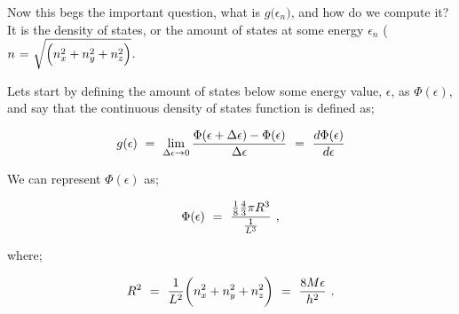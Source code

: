 \documentclass{article}
\begin{document}
Now this begs the important question, what is \begin{math} g \big( \epsilon_{n} \big) \end{math}, and how do we compute it? It is the density of states, or the amount of states at some energy \begin{math} \epsilon_{n} \end{math} ( \begin{math} n \hspace{0.025cm} = \hspace{0.025cm} \sqrt{ \Big( n_x^2 + n_y^2 + n_z^2 \Big)} \end{math}.

Lets start by defining the amount of states below some energy value, \begin{math} \epsilon \end{math}, as \begin{math} \Phi ( \epsilon ) \end{math}, and say that the continuous density of states function is defined as;

\begin{equation} \label{eb-eq-256-79}
g ( \epsilon ) \hspace{0.125cm} = \hspace{0.125cm} \lim_{\Delta \epsilon \rightarrow 0} \frac{ \Phi ( \epsilon + \Delta \epsilon ) - \Phi ( \epsilon )}{\Delta \epsilon} \hspace{0.125cm} = \hspace{0.125cm} \frac{d  \Phi ( \epsilon )}{d \epsilon}
\end{equation}

We can represent \begin{math} \Phi ( \epsilon ) \end{math} as;

\begin{equation} \label{eb-eq-256-80}
\Phi ( \epsilon ) \hspace{0.125cm} = \hspace{0.125cm} \frac{ \frac{1}{8} \frac{4}{3} \pi R^3}{\frac{1}{L^3}} \hspace{0.125cm} , 
\end{equation}

where;

\begin{equation} \label{eb-eq-256-81}
R^2 \hspace{0.125cm} = \hspace{0.125cm} \frac{1}{L^2} \bigg( n_x^2 + n_y^2 + n_z^2  \bigg) \hspace{0.125cm} = \hspace{0.125cm} \frac{8 M \epsilon}{h^2} \hspace{0.125cm} . 
\end{equation}
\end{document}
